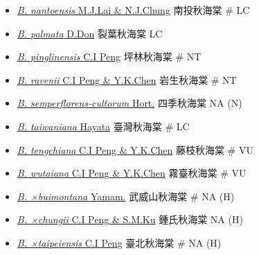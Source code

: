 \begin{itemize}
\begin{itemize}
        \item[] \href{http://www.theplantlist.org/tpl1.1/search?q=Begonia+nantoensis}{\textit{B. nantoensis} M.J.Lai \& N.J.Chung}   南投秋海棠  \# LC
        \item[] \href{http://www.theplantlist.org/tpl1.1/search?q=Begonia+palmata}{\textit{B. palmata} D.Don}   裂葉秋海棠   LC
        \item[] \href{http://www.theplantlist.org/tpl1.1/search?q=Begonia+pinglinensis}{\textit{B. pinglinensis} C.I Peng}   坪林秋海棠  \# NT
        \item[] \href{http://www.theplantlist.org/tpl1.1/search?q=Begonia+ravenii}{\textit{B. ravenii} C.I Peng \& Y.K.Chen}   岩生秋海棠  \# NT
        \item[] \href{http://www.theplantlist.org/tpl1.1/search?q=Begonia+semperflorens-cultorum}{\textit{B. semperflorens-cultorum} Hort.}   四季秋海棠   NA (N)
        \item[] \href{http://www.theplantlist.org/tpl1.1/search?q=Begonia+taiwaniana}{\textit{B. taiwaniana} Hayata}   臺灣秋海棠  \# LC
        \item[] \href{http://www.theplantlist.org/tpl1.1/search?q=Begonia+tengchiana}{\textit{B. tengchiana} C.I Peng \& Y.K.Chen}   藤枝秋海棠  \# VU
        \item[] \href{http://www.theplantlist.org/tpl1.1/search?q=Begonia+wutaiana}{\textit{B. wutaiana} C.I Peng \& Y.K.Chen}   霧臺秋海棠  \# VU
        \item[] \href{http://www.theplantlist.org/tpl1.1/search?q=Begonia+×buimontana}{\textit{B. ×buimontana} Yamam.}   武威山秋海棠  \# NA (H)
        \item[] \href{http://www.theplantlist.org/tpl1.1/search?q=Begonia+×chungii}{\textit{B. ×chungii} C.I Peng \& S.M.Ku}   鍾氏秋海棠   NA (H)
        \item[] \href{http://www.theplantlist.org/tpl1.1/search?q=Begonia+×taipeiensis}{\textit{B. ×taipeiensis} C.I Peng}   臺北秋海棠  \# NA (H)
  \end{itemize}
  \end{itemize}
